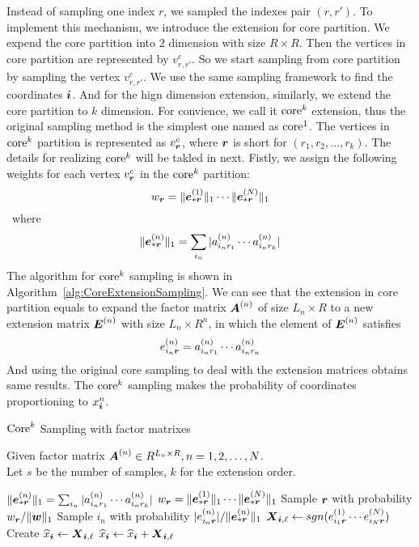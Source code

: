 \documentclass[letterpaper]{article}
\newcommand{\Sca}[3]{{#1}^{(#2)}_{i_#2#3}}%
\newcommand{\anr}[2]{\Sca{a}{#1}{#2}}
\newcommand{\score}[1]{\M{X}_{\V{i},#1}}
\newcommand{\V}[1]{{\bm{{\MakeLowercase{#1}}}}}
\newcommand{\VnC}[3]{\V{#1}^{(#2)}_{#3}}
\newcommand{\M}[1]{{\bm{{\MakeUppercase{#1}}}}}
\newcommand{\Mn}[2]{\M{#1}^{(#2)}}
\newcommand{\norm}[2]{\|#1\|_{#2}}
\newcommand{\Alg}[1] {Algorithm~\ref{alg:#1}}
\newcommand{\coord}{(i_1,i_2,\ldots,i_N)}
\newcommand{\predx}{\widehat{x}_{\V{i}}}
\begin{document}
Instead of sampling one index $r$, we sampled the indexes pair $(r,r')$.
To implement this mechanism,
we introduce the extension for core partition.
We expend the core partition into $2$ dimension with size $R\times R$.
Then the vertices in core partition are represented by $v^c_{r,r'}$.
So we start sampling from core partition by sampling the vertex $v^c_{r,r'}$.
We use the same sampling framework to find the coordinates $\V{i}$.
And for the hign dimension extension, similarly,
we extend the core partition to $k$ dimension.
For convience, we call it ${\rm core}^k$ extension,
thus the original sampling method is the simplest one named as ${\rm core}^1$.
The vertices in ${\rm core}^k$ partition is represented as $v^c_{\V{r}}$,
where $\V{r}$ is short for $(r_1,r_2,\ldots,r_k)$.
The details for realizing ${\rm core}^k$ will be takled in next.
Fistly, we assign the following weights for each vertex $v^c_\V{r}$ in the ${\rm core}^k$ partition:
\[
w_{\V{r}} = \norm{\VnC{e}{1}{*\V{r}}}{1}\cdots\norm{\VnC{e}{N}{*\V{r}}}{1}
\]\
where
\[
\norm{\VnC{e}{n}{*\V{r}}}{1} = \sum_{i_n}|\anr{n}{r_1}\cdots\anr{n}{r_k}|
\]
The algorithm for ${\rm core}^k$ sampling is shown in \Alg{CoreExtensionSampling}.
We can see that the extension in core partition equals to expand
the factor matrix $\Mn{A}{n}$ of size $L_n\times R$
to a new extension matrix $\Mn{E}{n}$ with size $L_n\times R^n$,
in which the element of $\Mn{E}{n}$ satisfies
\[
\Sca{e}{n}{\V{r}} = \anr{n}{r_1}\cdots\anr{n}{r_n}
\]
And using the original core sampling to deal with the extension matrices obtains same results.
The ${\rm core}^k$ sampling makes the probability of coordinates proportioning to $x^n_{\V{i}}$.
\begin{algorithm}[t]
    \caption{${\rm Core}^k$ Sampling with factor matrixes}
    \label{alg:CoreExtensionSampling}
    Given factor matrix $\M{A}^{(n)}\in R^{L_n\times R}, n = 1,2,\ldots,N$.\\
    Let $s$ be the number of samples, $k$ for the extension order.
    \begin{algorithmic}[1]
    \For{$\V{r}\in{\underbrace{R\times \cdots \times R}_{k}}$}
    \State $\norm{\VnC{e}{n}{*\V{r}}}{1} = \sum_{i_n}|\anr{n}{r_1}\cdots\anr{n}{r_k}|$
    \EndFor
    \State $w_{\V{r}} = \norm{\VnC{e}{1}{*\V{r}}}{1}\cdots\norm{\VnC{e}{N}{*\V{r}}}{1}$
    \EndFor
    \State Sample $\V{r}$ with probability $w_\V{r}/\norm{\V{W}}{1}$
    \For {$n = 1,...,N$}
    \State Sample $i_n$ with probability $|\Sca{e}{n}{\V{r}}|/\norm{\VnC{e}{n}{*\V{r}}}{1}$
    \EndFor
    \State
        $\score{\ell} \leftarrow sgn(\Sca{e}{1}{\V{r}}\cdots\Sca{e}{N}{\V{r}})$
    \If {$\V{i}=\coord$ has not been sampled}
    \State  Create $\predx \leftarrow \score{\ell} $
    \Else
    \State $\predx \leftarrow \predx + \score{\ell}$
    \EndIf
    \EndFor
    \end{algorithmic}
\end{algorithm}
\end{document}
